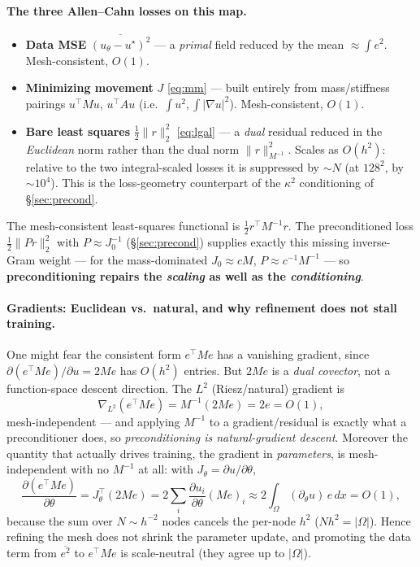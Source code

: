 \documentclass[11pt]{article}
\begin{document}
\paragraph{The three Allen--Cahn losses on this map.}
\begin{itemize}\itemsep2pt
  \item \textbf{Data MSE} $\overline{(u_\theta-u^\star)^2}$ --- a \emph{primal} field reduced by the
        mean $\approx\int e^2$. Mesh-consistent, $O(1)$.
  \item \textbf{Minimizing movement} $J$ \eqref{eq:mm} --- built entirely from mass/stiffness
        pairings $u^\top Mu$, $u^\top Au$ (i.e.\ $\int u^2,\int|\nabla u|^2$). Mesh-consistent, $O(1)$.
  \item \textbf{Bare least squares} $\tfrac12\|r\|_2^2$ \eqref{eq:lgal} --- a \emph{dual} residual
        reduced in the \emph{Euclidean} norm rather than the dual norm $\|r\|_{M^{-1}}^2$. Scales as
        $O(h^2)$: relative to the two integral-scaled losses it is suppressed by $\sim N$
        (at $128^2$, by $\sim10^4$). This is the loss-geometry counterpart of the $\kappa^2$
        conditioning of \S\ref{sec:precond}.
\end{itemize}
The mesh-consistent least-squares functional is $\tfrac12 r^\top M^{-1}r$. The preconditioned loss
$\tfrac12\|Pr\|_2^2$ with $P\approx J_0^{-1}$ (\S\ref{sec:precond}) supplies exactly this missing
inverse-Gram weight --- for the mass-dominated $J_0\approx cM$, $P\approx c^{-1}M^{-1}$ --- so
\textbf{preconditioning repairs the \emph{scaling} as well as the \emph{conditioning}}.

\paragraph{Gradients: Euclidean vs.\ natural, and why refinement does not stall training.} One might
fear the consistent form $e^\top Me$ has a vanishing gradient, since $\partial(e^\top Me)/\partial
u=2Me$ has $O(h^2)$ entries. But $2Me$ is a \emph{dual covector}, not a function-space descent
direction. The $L^2$ (Riesz/natural) gradient is
\begin{equation}
  \nabla_{L^2}(e^\top Me)=M^{-1}(2Me)=2e=O(1),
\end{equation}
mesh-independent --- and applying $M^{-1}$ to a gradient/residual is exactly what a preconditioner
does, so \emph{preconditioning is natural-gradient descent}. Moreover the quantity that actually
drives training, the gradient in \emph{parameters}, is mesh-independent with no $M^{-1}$ at all:
with $J_\theta=\partial u/\partial\theta$,
\begin{equation}
  \frac{\partial(e^\top Me)}{\partial\theta}
  =J_\theta^\top(2Me)
  =2\sum_i\frac{\partial u_i}{\partial\theta}(Me)_i
  \approx 2\!\int_\Omega(\partial_\theta u)\,e\,dx=O(1),
  \label{eq:theta-grad}
\end{equation}
because the sum over $N\sim h^{-2}$ nodes cancels the per-node $h^2$ ($Nh^2=|\Omega|$). Hence
refining the mesh does not shrink the parameter update, and promoting the data term from
$\overline{e^2}$ to $e^\top Me$ is scale-neutral (they agree up to $|\Omega|$).
\end{document}
